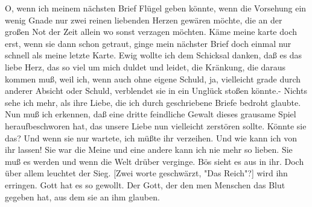 \def\day{22. 7. 1944}
\mktitle

O, wenn ich meinem n\"{a}chsten Brief Fl\"{u}gel geben k\"{o}nnte, wenn die Vorsehung ein wenig Gnade nur zwei reinen liebenden Herzen gew\"{a}ren m\"{o}chte, die an der gro{\ss}en Not der Zeit allein wo sonst verzagen m\"{o}chten.
K\"{a}me meine karte doch erst, wenn sie dann schon getraut, ginge mein n\"{a}chster Brief doch einmal nur schnell als meine letzte Karte.
Ewig wollte ich dem Schicksal danken, da{\ss} es das liebe Herz, das so viel um mich duldet und leidet, die Kr\"{a}nkung, die daraus kommen mu{\ss}, weil ich, wenn auch ohne eigene Schuld, ja, vielleicht grade durch anderer Absicht oder Schuld, verblendet sie in ein Ungl\"{u}ck sto{\ss}en k\"{o}nnte.-
Nichts sehe ich mehr, als ihre Liebe, die ich durch geschriebene Briefe bedroht glaubte.
Nun mu{\ss} ich erkennen, da{\ss} eine dritte feindliche Gewalt dieses grausame Spiel heraufbeschworen hat, das unsere Liebe nun vielleicht zerst\"{o}ren sollte.
K\"{o}nnte sie das?
Und wenn sie nur wartete, ich m\"{u}{\ss}te ihr verzeihen.
Und wie kann ich von ihr lassen!
Sie war die Meine und eine andere kann ich nie mehr so lieben.
Sie mu{\ss} es werden und wenn die Welt dr\"{u}ber verginge.
B\"{o}s sieht es aus in ihr.
Doch \"{u}ber allem leuchtet der Sieg.
{\color{red} [Zwei worte geschw\"{a}rzt, "Das Reich"?] } wird ihn erringen.
Gott hat es so gewollt.
Der Gott, der den men Menschen das Blut gegeben hat, aus dem sie an ihm glauben.

\clearpage
